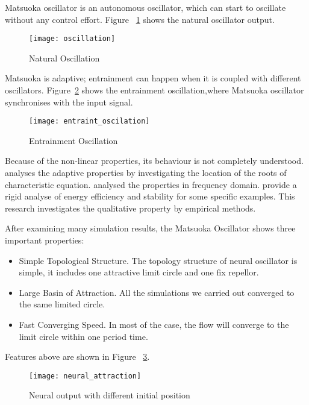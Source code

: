Matsuoka oscillator is an autonomous oscillator, which can start to oscillate without any control effort.
Figure ~\ref{fig:natural-oscillation} shows the natural oscillator output.
\begin{figure}[h]
\begin{center}
\texttt{[image: oscillation]}
\caption{Natural Oscillation}
\label{fig:natural-oscillation}
\end{center}
\end{figure}





Matsuoka is adaptive; entrainment can happen when it is coupled with different oscillators. 
Figure~\ref{fig:entraint-oscillation} shows the entrainment oscillation,where  Matsuoka oscillator synchronises with the input signal.
\begin{figure}[h]
\begin{center}
\texttt{[image: entraint\_oscilation]}
\caption{Entrainment Oscillation}
\label{fig:entraint-oscillation}
\end{center}
\end{figure}

Because of the non-linear properties, its behaviour is not completely understood. 
\citet{Matsuoka1987} analyses the adaptive properties by investigating the location of the roots of characteristic equation. 
\citet{Williamson1998} analysed the properties in frequency domain.
\citet{futakataentrainment} provide a rigid analyse of energy efficiency and stability for some specific examples.
This research investigates the qualitative property by  empirical methods.

After examining many simulation results, the Matsuoka Oscillator shows three important properties:
\begin{itemize}
\item{Simple Topological Structure.}
The topology structure of neural oscillator is simple, 
it includes one  attractive limit circle and one fix repellor.
\item{Large Basin of Attraction.}
All the simulations we carried out converged to the same limited circle.
\item{Fast Converging Speed.}
In most of the case, the flow will converge to the limit circle within one period time.
\end{itemize}


Features above are shown in Figure ~\ref{fig:time_timeAttraction}.
\begin{figure}
\begin{center}
\texttt{[image: neural\_attraction]}
\end{center}
\caption{Neural output with different initial position}
\label{fig:time_timeAttraction}
\end{figure}


